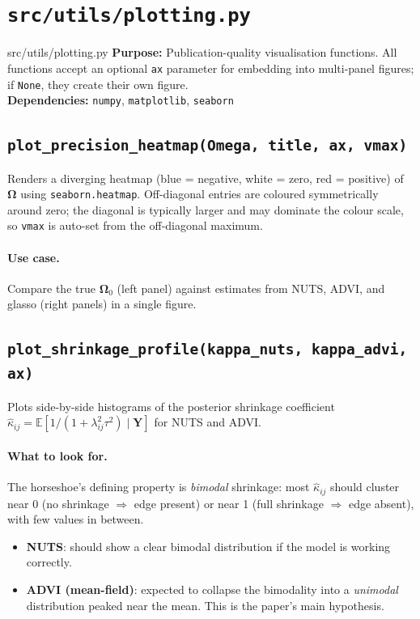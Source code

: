 \documentclass[11pt,a4paper]{article}
\newcommand{\E}{\mathbb{E}}
\newcommand{\bOmega}{\bm{\Omega}}
\begin{document}
\section{\texttt{src/utils/plotting.py}}\label{sec:plotting}

\begin{filecard}{src/utils/plotting.py}
\textbf{Purpose:} Publication-quality visualisation functions. All functions accept an optional \texttt{ax} parameter for embedding into multi-panel figures; if \texttt{None}, they create their own figure.
\\[0.3em]
\textbf{Dependencies:} \texttt{numpy}, \texttt{matplotlib}, \texttt{seaborn}
\end{filecard}

\subsection{\texttt{plot\_precision\_heatmap(Omega, title, ax, vmax)}}

Renders a diverging heatmap (blue = negative, white = zero, red = positive) of $\bOmega$ using \texttt{seaborn.heatmap}. Off-diagonal entries are coloured symmetrically around zero; the diagonal is typically larger and may dominate the colour scale, so \texttt{vmax} is auto-set from the off-diagonal maximum.

\paragraph{Use case.} Compare the true $\bOmega_0$ (left panel) against estimates from NUTS, ADVI, and glasso (right panels) in a single figure.

\subsection{\texttt{plot\_shrinkage\_profile(kappa\_nuts, kappa\_advi, ax)}}

Plots side-by-side histograms of the posterior shrinkage coefficient $\hat\kappa_{ij} = \E[1/(1 + \lambda_{ij}^2\tau^2) \mid \bm{Y}]$ for NUTS and ADVI.

\paragraph{What to look for.} The horseshoe's defining property is \emph{bimodal} shrinkage: most $\hat\kappa_{ij}$ should cluster near 0 (no shrinkage $\Rightarrow$ edge present) or near 1 (full shrinkage $\Rightarrow$ edge absent), with few values in between.
\begin{itemize}[nosep]
  \item \textbf{NUTS}: should show a clear bimodal distribution if the model is working correctly.
  \item \textbf{ADVI (mean-field)}: expected to collapse the bimodality into a \emph{unimodal} distribution peaked near the mean. This is the paper's main hypothesis.
\end{itemize}
\end{document}
